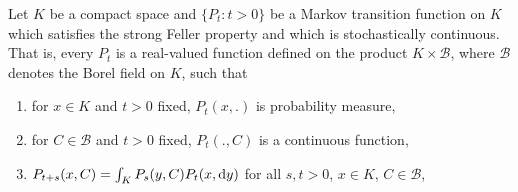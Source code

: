 \begin{example}\label{ex:b4-2.6}
Let $K$ be a compact space and $\{P_t \colon t > 0\}$ be a
Markov transition function on $K$ which satisfies the strong Feller
property and which is stochastically continuous.
That is, every
$P_t$ is a real-valued function defined on the product $K \times \mathcal{B}$, where $\mathcal{B}$
denotes the Borel field on $K$, such that
\begin{enumerate}[\upshape (i)]
    \item 
    for $x \in K$ and $t > 0$ fixed, $P_t(x,.)$ is probability measure,

    \item 
    for $C \in \mathcal{B}$ and $t > 0$ fixed, $P_t(.,C)$ is a continuous function,

    \item 
    $P_{t+s}(x,C) = \int_K P_s(y,C)P_t(x,\mathop{}\!\mathrm{d}{y})$ for all $s,t > 0$, $x \in K$, $C \in \mathcal{B}$,


\end{enumerate}
\end{example}
